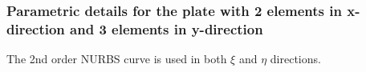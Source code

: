 \documentclass[11pt]{article}
\begin{document}
\subsubsection{Parametric details for the plate with 2 elements in x-direction and  3 elements in y-direction} \label{ParaMultiEle}
The 2nd order NURBS curve is used in both $\xi$ and $\eta$ directions. \\

\end{document}
